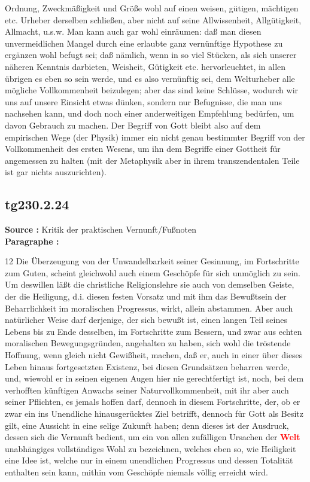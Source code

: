 \documentclass[a4paper,12pt,twoside]{book}
\newcommand{\match}[1]{\textcolor{red}{\textbf{#1}}}
\begin{document}
Ordnung, Zweckmäßigkeit und Größe wohl auf einen weisen, gütigen, mächtigen etc. Urheber derselben schließen, aber nicht auf seine Allwissenheit, Allgütigkeit, Allmacht, u.s.w. Man kann auch gar wohl einräumen: daß man diesen unvermeidlichen Mangel durch eine erlaubte ganz vernünftige Hypothese zu ergänzen wohl befugt sei; daß nämlich, wenn in so viel Stücken, als sich unserer näheren Kenntnis darbieten, Weisheit, Gütigkeit etc. hervorleuchtet, in allen übrigen es eben so sein werde, und es also vernünftig sei, dem Welturheber alle mögliche Vollkommenheit beizulegen; aber das sind keine Schlüsse, wodurch wir uns auf unsere Einsicht etwas dünken, sondern nur Befugnisse, die man uns nachsehen kann, und doch noch einer anderweitigen Empfehlung bedürfen, um davon Gebrauch zu machen. Der Begriff von Gott bleibt also auf dem empirischen Wege (der Physik) immer ein nicht genau bestimmter Begriff von der Vollkommenheit des ersten Wesens, um ihn dem Begriffe einer Gottheit für angemessen zu halten (mit der Metaphysik aber in ihrem transzendentalen Teile ist gar nichts auszurichten). 
	
	\subsection*{tg230.2.24} 
	\textbf{Source : }Kritik der praktischen Vernunft/Fußnoten\\  
	
	\noindent\textbf{Paragraphe : }
	
	12 Die Überzeugung von der Unwandelbarkeit seiner Gesinnung, im Fortschritte zum Guten, scheint gleichwohl auch einem Geschöpfe für sich unmöglich zu sein. Um deswillen läßt die christliche Religionslehre sie auch von demselben Geiste, der die Heiligung, d.i. diesen festen Vorsatz und mit ihm das Bewußtsein der Beharrlichkeit im moralischen Progressus, wirkt, allein abstammen. Aber auch natürlicher Weise darf derjenige, der sich bewußt ist, einen langen Teil seines Lebens bis zu Ende desselben, im Fortschritte zum Bessern, und zwar aus echten moralischen Bewegungsgründen, angehalten zu haben, sich wohl die tröstende Hoffnung, wenn gleich nicht Gewißheit, machen, daß er, auch in einer über dieses Leben hinaus fortgesetzten Existenz, bei diesen Grundsätzen beharren werde, und, wiewohl er in seinen eigenen Augen hier nie gerechtfertigt ist, noch, bei dem verhofften künftigen Anwachs seiner Naturvollkommenheit, mit ihr aber auch seiner Pflichten, es jemals hoffen darf, dennoch in diesem Fortschritte, der, ob er zwar ein ins Unendliche hinausgerücktes Ziel betrifft, dennoch für Gott als Besitz gilt, eine Aussicht in eine selige Zukunft haben; denn dieses ist der Ausdruck, dessen sich die Vernunft bedient, um ein von allen zufälligen Ursachen der \match{Welt} unabhängiges vollständiges Wohl zu bezeichnen, welches eben so, wie Heiligkeit eine Idee ist, welche nur in einem unendlichen Progressus und dessen Totalität enthalten sein kann, mithin vom Geschöpfe niemals völlig erreicht wird. 
	
\end{document}
